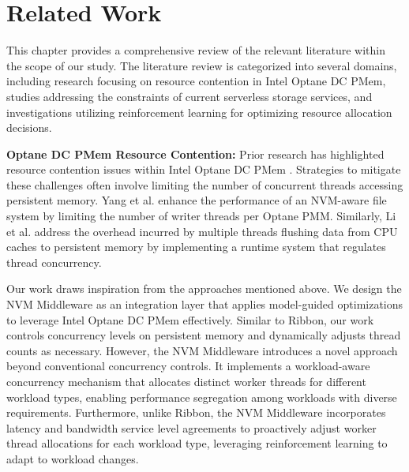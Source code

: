 \chapter{Related Work}

This chapter provides a comprehensive review of the relevant literature within the scope of our study. The literature review is categorized into several domains, including research focusing on resource contention in Intel Optane DC PMem, studies addressing the constraints of current serverless storage services, and investigations utilizing reinforcement learning for optimizing resource allocation decisions.

\textbf{Optane DC PMem Resource Contention:} Prior research has highlighted resource contention issues within Intel Optane DC PMem \cite{yang2020empirical,wu2020ribbon}. Strategies to mitigate these challenges often involve limiting the number of concurrent threads accessing persistent memory. Yang et al. \cite{yang2020empirical} enhance the performance of an NVM-aware file system by limiting the number of writer threads per Optane PMM. Similarly, Li et al. \cite{wu2020ribbon} address the overhead incurred by multiple threads flushing data from CPU caches to persistent memory by implementing a runtime system that regulates thread concurrency.

Our work draws inspiration from the approaches mentioned above. We design the NVM Middleware as an integration layer that applies model-guided optimizations to leverage Intel Optane DC PMem effectively. Similar to Ribbon, our work controls concurrency levels on persistent memory and dynamically adjusts thread counts as necessary. However, the NVM Middleware introduces a novel approach beyond conventional concurrency controls. It implements a workload-aware concurrency mechanism that allocates distinct worker threads for different workload types, enabling performance segregation among workloads with diverse requirements. Furthermore, unlike Ribbon, the NVM Middleware incorporates latency and bandwidth service level agreements to proactively adjust worker thread allocations for each workload type, leveraging reinforcement learning to adapt to workload changes.


